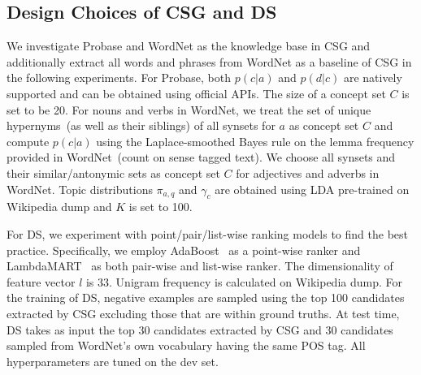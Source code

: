 
\subsection{Design Choices of CSG and DS}
\label{sec:ablation}

We investigate Probase and WordNet as the knowledge base in CSG and additionally extract all words and phrases from WordNet as a baseline of CSG in the following experiments. For Probase, both $p(c|a)$ and $p(d|c)$ are natively supported and can be obtained using official APIs. The size of a concept set $C$ is set to be 20. For nouns and verbs in WordNet, we treat the set of unique hypernyms~(as well as their siblings) of all synsets for $a$ as concept set $C$ and compute
$p(c|a)$ using the Laplace-smoothed Bayes rule on the lemma frequency provided in WordNet~(count on sense tagged text). We choose all synsets and their similar/antonymic sets as concept set $C$ for adjectives and adverbs in WordNet. Topic distributions $\pi_{a,q}$ and $\gamma_c$ are obtained using LDA pre-trained on Wikipedia dump and $K$ is set to 100.

For DS, we experiment with point/pair/list-wise ranking models to find the best practice.
Specifically, we employ AdaBoost~\cite{freund1997decision} as a point-wise ranker and LambdaMART~\cite{Burges2010} as both pair-wise and list-wise ranker. The dimensionality of feature vector $l$ is 33. Unigram frequency is calculated on Wikipedia dump. For the training of DS, negative examples are sampled using the top 100 candidates extracted by CSG excluding those that are within ground truths. At test time, DS takes as input the top 30 candidates extracted by CSG 
and 30 candidates sampled from WordNet's own vocabulary having the same POS tag. All hyperparameters are tuned on the dev set.

